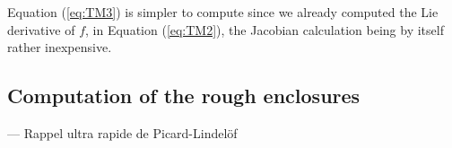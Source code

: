 \documentclass{sig-alternate-05-2015} %
\newcommand\ForAuthors[1]%
 {\par\smallskip                     %
  \begin{center}%
   \fbox%
   {\parbox{0.9\linewidth}%
    {\raggedright\sc--- #1}%
   }%
  \end{center}%
  \par\smallskip                     %
 }
\begin{document}
Equation (\ref{eq:TM3}) 
is simpler to compute since we already computed
the Lie derivative of $f$, in Equation (\ref{eq:TM2}), the Jacobian calculation being by
itself rather 
inexpensive. 

\subsection{Computation of the rough enclosures}
\label{roughenc}

\ForAuthors{Rappel ultra rapide de Picard-Lindel\"of}

\end{document}
